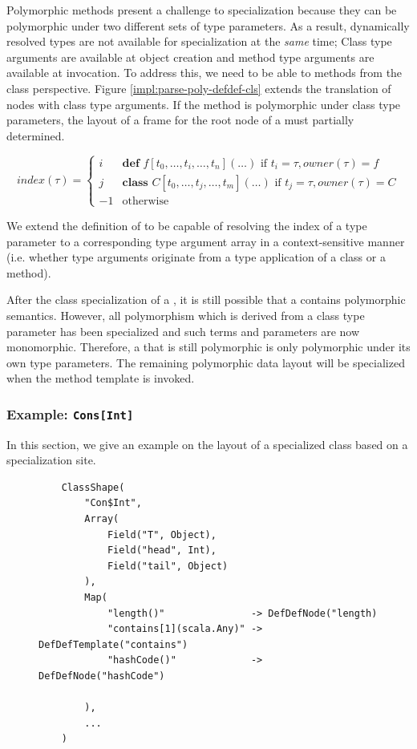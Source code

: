Polymorphic methods present a challenge to specialization because they can be polymorphic under two different sets of type parameters.
As a result, dynamically resolved types are not available for specialization at the \textit{same} time; Class type arguments are available at object creation and method type arguments are available at invocation.
To address this, we need to be able to  methods from the class perspective.
Figure \ref{impl:parse-poly-defdef-cls} extends the translation of  nodes with class type arguments.
If the method is polymorphic under class type parameters, the layout of a frame for the root node of a  must partially determined.

$$
index(\tau) = 
\begin{cases}
	i  & \textbf{def } f[t_0, \ldots, t_i, \ldots, t_n](\ldots) \text{ if } t_i = \tau, owner(\tau)=f \\
	j  & \textbf{class } C[t_0, \ldots, t_j, \ldots, t_m](\ldots) \text{ if } t_j = \tau, owner(\tau)=C \\
	-1 & \text{otherwise}
\end{cases}
$$

We extend the definition of  to be capable of resolving the index of a type parameter to a corresponding type argument array in a context-sensitive manner (i.e. whether type arguments originate from a type application of a class or a method).

After the class specialization of a , it is still possible that a  contains polymorphic semantics.
However, all polymorphism which is derived from a class type parameter has been specialized and such terms and parameters are now monomorphic.
Therefore, a  that is still polymorphic is only polymorphic under its own type parameters.
The remaining polymorphic data layout will be specialized when the method template is invoked.

\subsubsection*{Example: \texttt{Cons[Int]}}

In this section, we give an example on the layout of a specialized class based on a specialization site.

\begin{figure}[!htb]
	\begin{verbatim}
	ClassShape(
		"Con$Int",
		Array(
			Field("T", Object),
			Field("head", Int),
			Field("tail", Object)
		),
		Map(
			"length()"               -> DefDefNode("length)
			"contains[1](scala.Any)" -> DefDefTemplate("contains")
			"hashCode()"             -> DefDefNode("hashCode")
		
		),
		...
	)
	\end{verbatim}
\end{figure}

